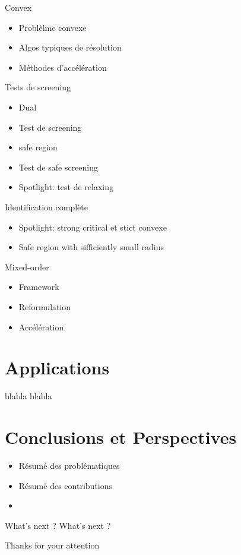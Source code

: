 \documentclass[10pt]{beamer}
\begin{document}
\begin{frame}{Convex}
  \begin{itemize}
    \item Problèlme convexe
    \item Algos typiques de résolution
    \item Méthodes d'accélération
  \end{itemize}
\end{frame}

\begin{frame}{Tests de screening}
  \begin{itemize}
    \item Dual
    \item Test de screening
    \item safe region
    \item Test de safe screening
    \item Spotlight: test de relaxing
  \end{itemize}
\end{frame}

\begin{frame}{Identification complète}
  \begin{itemize}
    \item Spotlight: strong critical et stict convexe
    \item Safe region with sifficiently small radius
  \end{itemize}
\end{frame}

\begin{frame}{Mixed-order}
  \begin{itemize}
    \item Framework
    \item Reformulation
    \item Accélération
  \end{itemize}
\end{frame}

\section{Applications}

\begin{frame}{blabla}
  blabla
\end{frame}

\section{Conclusions et Perspectives}

\begin{frame}
  \begin{itemize}
    \item Résumé des problématiques
    \item Résumé des contributions
    \item 
  \end{itemize}
\end{frame}

\begin{frame}{What's next ?}
  What's next ?
\end{frame}

\begin{frame}[standout]
  Thanks for your attention
\end{frame}
\end{document}
